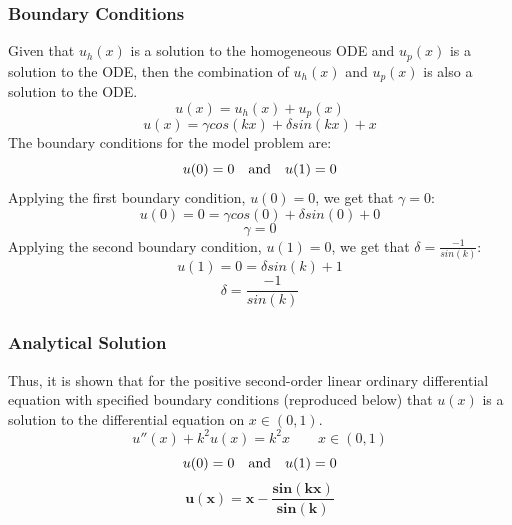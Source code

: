 \documentclass[10pt, reqno]{article}		%
\numberwithin{equation}{section}
\begin{document}
\subsubsection{Boundary Conditions}

Given that $u_h(x)$ is a solution to the homogeneous ODE and $u_p(x)$ is a solution to the ODE, then the combination of $u_h(x)$ and $u_p(x)$ is also a solution to the ODE.
\begin{equation}
u(x) = u_h(x) + u_p(x)
\end{equation}
\begin{equation}
u(x) = \gamma cos(kx) + \delta sin(kx) + x
\end{equation}
The boundary conditions for the model problem are:
\begin{equation}
u(0) = 0 \quad \textnormal{and} \quad u(1) = 0 
\end{equation}
Applying the first boundary condition, $u(0) = 0$, we get that $\gamma = 0$:
\begin{equation}
u(0) = 0 = \gamma cos(0) + \delta sin(0) + 0
\end{equation}
\begin{equation}
\gamma = 0
\end{equation}
Applying the second boundary condition, $u(1) = 0$, we get that $\delta = \frac{-1}{sin(k)}$:
\begin{equation}
u(1) = 0 = \delta sin(k) + 1
\end{equation}
\begin{equation}
\delta = \frac{-1}{sin(k)}
\end{equation}

\subsubsection{Analytical Solution}

Thus, it is shown that for the positive second-order linear ordinary differential equation with specified boundary conditions (reproduced below) that $u(x)$ is a solution to the differential equation on $x \in (0, 1)$.
\begin{equation}
u''(x)+k^2u(x)=k^2x \qquad x \in (0, 1)
\end{equation}
\begin{equation}
u(0) = 0 \quad \textnormal{and} \quad u(1) = 0 
\end{equation}
\begin{equation}
\mathbf{u(x) = x - \frac{sin(kx)}{sin(k)}}
\end{equation}
\end{document}
